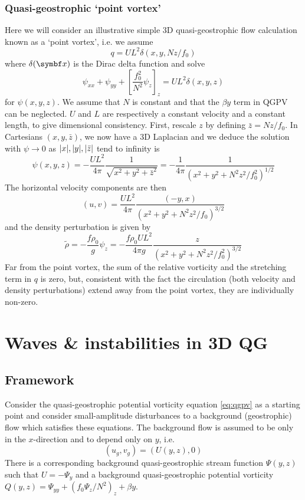 \documentclass{jknotes}
\begin{document}
\subsubsection{Quasi-geostrophic `point vortex'}
Here we will consider an illustrative simple 3D quasi-geostrophic flow
calculation known as a `point vortex', i.e. we assume
\begin{equation}
	q = U L^2 \delta(x,y, Nz/f_0)
\end{equation}
where $\delta(\x)$ is the Dirac delta function and solve
\begin{equation}
	\psi_{xx} + \psi_{yy} + \left[ \frac{f_0^2}{N^2} \psi_z\right]_z = UL^2
	\delta(x,y,z)
\end{equation}
for $\psi(x,y,z)$. We assume that $N$ is constant and that the $\beta y$ term
in QGPV can be neglected. $U$ and $L$ are respectively a constant velocity and
a constant length, to give dimensional consistency. First, rescale $z$ by
defining $\bar{z} = Nz/f_0$. In Cartesians $(x,y,\bar{z})$, we now have a 3D
Laplacian and we deduce the solution with $\psi \to 0$ as $\abs{x}, \abs{y},
\abs{\bar{z}}$ tend to infinity is
\begin{equation}
	\psi(x,y,z) = -\frac{UL^2}{4\pi} \frac{1}{\sqrt{x^2+y^2+\bar{z}^2}} =
	-\frac{1}{4\pi} \frac{1}{(x^2+y^2+N^2z^2/f_0^2)^{1/2}}
\end{equation}
The horizontal velocity components are then
\begin{equation}
	(u,v) = \frac{UL^2}{4\pi} \frac{(-y,x)}{(x^2+y^2+N^2z^2/f_0)^{3/2}}
\end{equation}
and the density perturbation is given by
\begin{equation}
	\tilde{\rho} = -\frac{f \rho_0}{g} \psi_z = -\frac{f \rho_0 U L^2}{4\pi g}
	\frac{z}{(x^2+y^2+N^2z^2/f_0^2)^{3/2}}
\end{equation}
Far from the point vortex, the sum of the relative vorticity and the
stretching term in $q$ is zero, but, consistent with the fact the circulation
(both velocity and density perturbations) extend away from the point vortex,
they are individually non-zero.

\section{Waves \& instabilities in 3D QG}
\subsection{Framework}
Consider the quasi-geostrophic potential vorticity equation \eqref{eq:qgpv} as
a starting point and consider small-amplitude disturbances to a background
(geostrophic) flow which satisfies these equations. The background flow is
assumed to be only in the $x$-direction and to depend only on $y$, i.e.
\begin{equation}
	(u_g,v_g) = (U(y,z), 0)
\end{equation}
There is a corresponding background quasi-geostrophic stream function
$\Psi(y,z)$ such that $U = -\Psi_y$ and a background quasi-geostrophic
potential vorticity $Q(y,z) = \Psi_{yy} + (f_0\Psi_z/N^2)_z + \beta y$.
\end{document}
